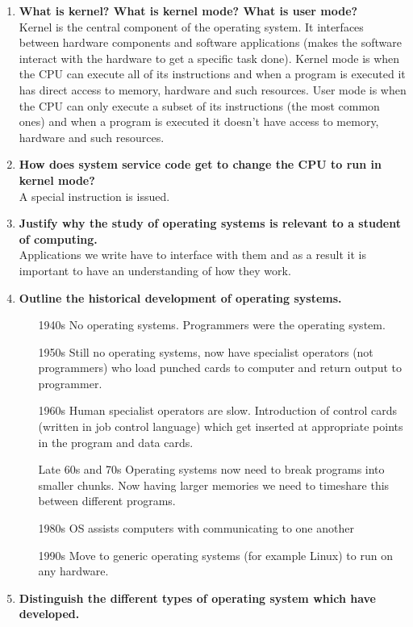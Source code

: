 \begin{enumerate}
    \item \textbf{What is kernel? What is kernel mode? What is user mode?}\\
    Kernel is the central component of the operating system. It interfaces between hardware components and software applications (makes the software interact with the hardware to get a specific task done). Kernel mode is when the CPU can execute all of its instructions and when a program is executed it has direct access to memory, hardware and such resources. User mode is when the CPU can only execute a subset of its instructions (the most common ones) and when a program is executed it doesn't have access to memory, hardware and such resources.
    \item \textbf{How does system service code get to change the CPU to run in kernel mode? }\\
    A special instruction is issued.
    \item \textbf{Justify why the study of operating systems is relevant to a student of computing. }\\
    Applications we write have to interface with them and as a result it is important to have an understanding of how they work.
    \item \textbf{Outline the historical development of operating systems. }
    \begin{itemize}
        \item[1940s] No operating systems. Programmers were the operating system.
        \item[1950s] Still no operating systems, now have specialist operators (not programmers) who load punched cards to computer and return output to programmer.
        \item[1960s] Human specialist operators are slow. Introduction of control cards (written in job control language) which get inserted at appropriate points in the program and data cards.
        \item[Late 60s and 70s] Operating systems now need to break programs into smaller chunks. Now having larger memories we need to timeshare this between different programs. 
        \item[1980s] OS assists computers with communicating to one another
        \item[1990s] Move to generic operating systems (for example Linux) to run on any hardware.
    \end{itemize}
    \item \textbf{Distinguish the different types of operating system which have developed. }

\end{enumerate}
